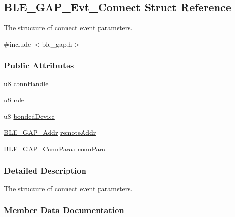 \hypertarget{struct_b_l_e___g_a_p___evt___connect}{}\subsection{B\+L\+E\+\_\+\+G\+A\+P\+\_\+\+Evt\+\_\+\+Connect Struct Reference}
\label{struct_b_l_e___g_a_p___evt___connect}


The structure of connect event parameters.  




{\ttfamily \#include $<$ble\+\_\+gap.\+h$>$}

\subsubsection*{Public Attributes}
\begin{DoxyCompactItemize}
\item 
u8 \hyperlink{struct_b_l_e___g_a_p___evt___connect_a585a2c338d73938f7f7914f638b8e16f}{conn\+Handle}
\item 
u8 \hyperlink{struct_b_l_e___g_a_p___evt___connect_a828ed427f121650cd78ceb07bb961cd6}{role}
\item 
u8 \hyperlink{struct_b_l_e___g_a_p___evt___connect_a72cb754f1f7a0bd6b6d13e29327a96d9}{bonded\+Device}
\item 
\hyperlink{struct_b_l_e___g_a_p___addr}{B\+L\+E\+\_\+\+G\+A\+P\+\_\+\+Addr} \hyperlink{struct_b_l_e___g_a_p___evt___connect_ae0a227aef87cce09e94203e8b5387c02}{remote\+Addr}
\item 
\hyperlink{struct_b_l_e___g_a_p___conn_paras}{B\+L\+E\+\_\+\+G\+A\+P\+\_\+\+Conn\+Paras} \hyperlink{struct_b_l_e___g_a_p___evt___connect_a43ee7c8a481bbd13fb3ea6b526f95194}{conn\+Para}
\end{DoxyCompactItemize}


\subsubsection{Detailed Description}
The structure of connect event parameters. 

\subsubsection{Member Data Documentation}
